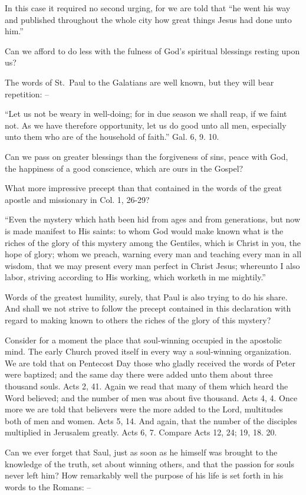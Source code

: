 \documentclass[
]{book}
\begin{document}
In this case it required no second urging, for we are told that ``he went his way and published throughout the whole city how great things Jesus had done unto him.''

Can we afford to do less with the fulness of God's spiritual blessings resting upon us?

The words of St.~Paul to the Galatians are well known, but they will bear repetition: --

``Let us not be weary in well-doing; for in due season we shall reap, if we faint not. As we have therefore opportunity, let us do good unto all men, especially unto them who are of the household of faith.'' Gal. 6, 9. 10.

Can we pass on greater blessings than the forgiveness of sins, peace with God, the happiness of a good conscience, which are ours in the Gospel?

What more impressive precept than that contained in the words of the great apostle and missionary in Col. 1, 26-29?

``Even the mystery which hath been hid from ages and from generations, but now is made manifest to His saints: to whom God would make known what is the riches of the glory of this mystery among the Gentiles, which is Christ in you, the hope of glory; whom we preach, warning every man and teaching every man in all wisdom, that we may present every man perfect in Christ Jesus; whereunto I also labor, striving according to His working, which worketh in me mightily.''

Words of the greatest humility, surely, that Paul is also trying to do his share. And shall we not strive to follow the precept contained in this declaration with regard to making known to others the riches of the glory of this mystery?

Consider for a moment the place that soul-winning occupied in the apostolic mind. The early Church proved itself in every way a soul-winning organization. We are told that on Pentecost Day those who gladly received the words of Peter were baptized; and the same day there were added unto them about three thousand souls. Acts 2, 41. Again we read that many of them which heard the Word believed; and the number of men was about five thousand. Acts 4, 4. Once more we are told that believers were the more added to the Lord, multitudes both of men and women. Acts 5, 14. And again, that the number of the disciples multiplied in Jerusalem greatly. Acts 6, 7. Compare Acts 12, 24; 19, 18. 20.

Can we ever forget that Saul, just as soon as he himself was brought to the knowledge of the truth, set about winning others, and that the passion for souls never left him? How remarkably well the purpose of his life is set forth in his words to the Romans: --
\end{document}
